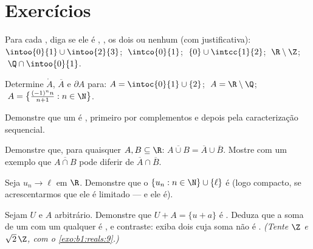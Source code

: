 \section{Exercícios}

\begin{exercise}[$\star$]\label{exo:b1:topology:1}
Para cada , diga se ele é , , os dois ou nenhum
(com justificativa): $\intoo{0}{1} \cup \intoo{2}{3}$; $\;\intco{0}{1}$;
$\;\{0\} \cup \intcc{1}{2}$; $\;\R \setminus \Z$; $\;\Q \cap
\intoo{0}{1}$.
\end{exercise}

\begin{exercise}[$\star$]\label{exo:b1:topology:2}
Determine $\mathring A$, $\overline A$ e $\partial A$ para:
$A = \intoc{0}{1} \cup \{2\}$; $\;A = \R \setminus \Q$;
$\;A = \bigl\{\frac{(-1)^n n}{n+1} : n \in \N\bigr\}$.
\end{exercise}

\begin{exercise}[$\star$]\label{exo:b1:topology:3}
Demonstre que um  é , primeiro por complementos e
depois pela caracterização sequencial.
\end{exercise}

\begin{exercise}[$\star$]\label{exo:b1:topology:4}
Demonstre que, para quaisquer $A, B \subseteq \R$: $\overline{A \cup B} =
\overline A \cup \overline B$. Mostre com um exemplo que
$\overline{A \cap B}$ pode diferir de $\overline A \cap \overline
B$.
\end{exercise}

\begin{exercise}[$\star\star$]\label{exo:b1:topology:5}
Seja $u_n \to \ell$ em $\R$. Demonstre que o  $\{u_n : n \in \N\}
\cup \{\ell\}$ é  (logo compacto, se acrescentarmos que ele é
limitado --- e ele é).
\end{exercise}

\begin{exercise}[$\star\star$]\label{exo:b1:topology:6}
Sejam $U$  e $A$ arbitrário. Demonstre que $U + A = \{u + a\}$ é
. Deduza que a soma de um  com um  qualquer é
, e contraste: exiba dois  \emph{} cuja soma não
é . \emph{(Tente $\Z$ e $\sqrt 2\,\Z$, com o \cref{exo:b1:reals:9}.)}
\end{exercise}

